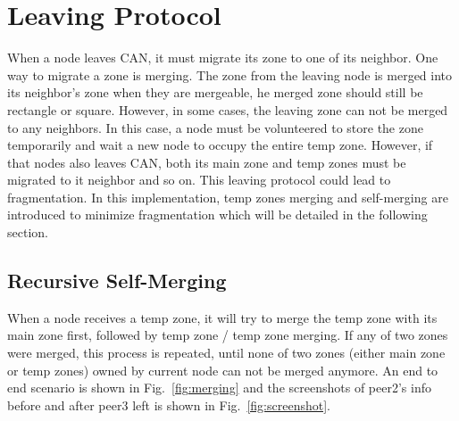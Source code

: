 \documentclass[11pt, oneside]{article}   	%
\begin{document}
\section{Leaving Protocol}
When a node leaves CAN, it must migrate its zone to one of its neighbor. One way to migrate a zone is merging. The zone from the leaving node is merged into its neighbor's zone when they are mergeable, he merged zone should still be rectangle or square. However, in some cases, the leaving zone can not be merged to any neighbors. In this case, a node must be volunteered to store the zone temporarily and wait a new node to occupy the entire temp zone. However, if that nodes also leaves CAN, both its main zone and temp zones must be migrated to it neighbor and so on. This leaving protocol could lead to fragmentation. In this implementation, temp zones merging and self-merging are introduced to minimize fragmentation which will be detailed in the following section.

\subsection{Recursive Self-Merging}
When a node receives a temp zone, it will try to merge the temp zone with its main zone first, followed by temp zone / temp zone merging. If any of two zones were merged, this process is repeated, until none of two zones (either main zone or temp zones) owned by current node can not be merged anymore. An end to end scenario is shown in Fig.~\ref{fig:merging} and the screenshots of peer2's info before and after peer3 left is shown in Fig.~\ref{fig:screenshot}.
\end{document}
